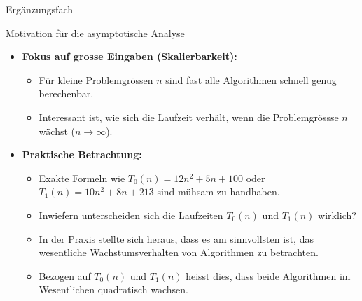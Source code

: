 

\begin{frame}{Ergänzungsfach}
\end{frame}

\begin{frame}{Motivation für die asymptotische Analyse}
	\begin{itemize}[<+->]
		\item \textbf{Fokus auf grosse Eingaben (Skalierbarkeit):}
		\begin{itemize}
			\item Für kleine Problemgrössen $n$ sind fast alle Algorithmen schnell genug berechenbar.
			\item Interessant ist, wie sich die Laufzeit verhält, wenn die Problemgrössse $n$ wächst ($n \to \infty$).
		\end{itemize}
		\item \textbf{Praktische Betrachtung:}
		\begin{itemize}
			\item Exakte Formeln wie $T_0(n) = 12n^2 + 5n + 100$ oder $T_1(n) = 10n^2 + 8n + 213$ sind mühsam zu handhaben.
			\item Inwiefern unterscheiden sich die Laufzeiten $T_0(n)$ und $T_1(n)$ wirklich?
			\item In der Praxis stellte sich heraus, dass es am sinnvollsten ist, das wesentliche Wachstumsverhalten von Algorithmen zu betrachten.
			\item Bezogen auf $T_0(n)$ und $T_1(n)$ heisst dies, dass beide Algorithmen im Wesentlichen quadratisch wachsen.
		\end{itemize}
	\end{itemize}
\end{frame}

